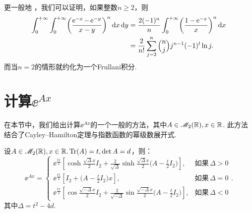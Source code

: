 更一般地 \cite{21}，我们可以证明，如果整数$n\ge2$，则
\begin{align*}
  \int_0^{+\infty}\int_0^{+\infty}\left( \frac{\ee^{- x} - \ee^{- y}}{x-y} \right)^n \dif x\dif y  & = \frac{2(-1)^n}n \int_0^{+\infty} \left( \frac{1-\ee^{-x}} x \right)^n \dif x \\
  & = \frac2{n!}\sum_{j=2}^n \Binom nj j^{n-1}(-1)^l\ln j.
\end{align*}
而当$n=2$的情形就约化为一个Frullani积分.

\section{计算$\ee^{Ax}$}
在本节中，我们给出计算$\ee^{Ax}$的一个一般的方法，其中$A\in\mathscr M_2(\mathbb R),x\in\mathbb R$. 此方法结合了Cayley--Hamilton定理与指数函数的幂级数展开式.

\begin{mybox}
  \begin{theorem}[指数矩阵$\ee^{Ax}$.]

    设$A\in\mathscr M_2(\mathbb R),x\in\mathbb R.\operatorname{Tr}(A)=t,\det A=d$，则：
    \[
      \ee^{Ax} =
      \begin{cases}
        \ee^{\frac{tx}2} \left[ \cosh\frac{\sqrt\varDelta x}2I_2 + \frac2{\sqrt{\varDelta}}\sinh\frac{\sqrt\varDelta x}2\Big( A - \frac t2I_2 \Big) \right], & \text{如果}\, \varDelta > 0 \\
        \ee^{\frac{tx}2} \left[ I_2 + \Big( A - \frac t2I_2 \Big)x \right], & \text{如果}\, \varDelta = 0 \\
        \ee^{\frac{tx}2} \left[ \cos\frac{\sqrt{-\varDelta} x}2I_2 + \frac2{\sqrt{-\varDelta}}\sin
        \frac{\sqrt{-\varDelta} x}2\Big( A - \frac t2I_2 \Big) \right], & \text{如果}\, \varDelta < 0
      \end{cases}.
    \]
    其中$\varDelta=t^2-4d$.
  \end{theorem}
\end{mybox}

